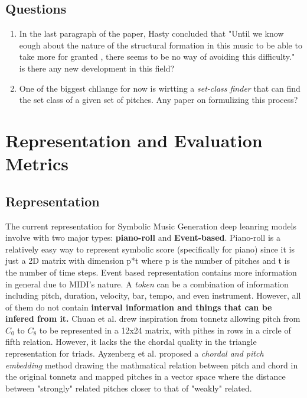 \documentclass[12pt]{report}
\begin{document}
\subsection*{Questions}
\begin{enumerate}
    \item In the last paragraph of the paper, Hasty concluded 
    that "Until we know eough about the nature of the structural
    formation in this music to be able to take more for granted
    , there seems to be no way of avoiding this difficulty." is 
    there any new development in this field?
    \item One of the biggest chllange for now is wirtting a 
    \textit{set-class finder} that can find the set class 
    of a given set of pitches. Any paper on formulizing this process?
\end{enumerate}

\section*{}
\section*{Representation and Evaluation Metrics}
\subsection*{Representation}
The current representation for Symbolic Music Generation deep leanring models 
involve with two major types\cite{survey}: \textbf{piano-roll}\cite{pianoroll}
and \textbf{Event-based}\cite{MusBERT}. Piano-roll is a relatively easy way to
represent symbolic score (specifically for piano) since it is just a 2D matrix
with dimension p*t where p is the number of pitches and t is the number of time
steps. Event based representation contains more information in general due to 
MIDI's nature. A \textit{token} can be a combination of information including
pitch, duration, velocity, bar, tempo, and even instrument. However, all of them
do not contain \textbf{interval information and things that can be infered from it.}
Chuan et al. drew inspiration from tonnetz \cite{AAAI_tonnetz} allowing pitch 
from $C_0$ to $C_8$ to be represented in a 12x24 matrix, with pithes in rows in 
a circle of fifth relation. However, it lacks the the chordal quality in the 
triangle representation for triads. Ayzenberg et al. proposed a \textit{chordal
and pitch embedding} method drawing the mathmatical relation between pitch and 
chord in the original tonnetz and mapped pitches in a vector space where 
the distance between "strongly" related pitches closer to that of "weakly" related.
\end{document}
